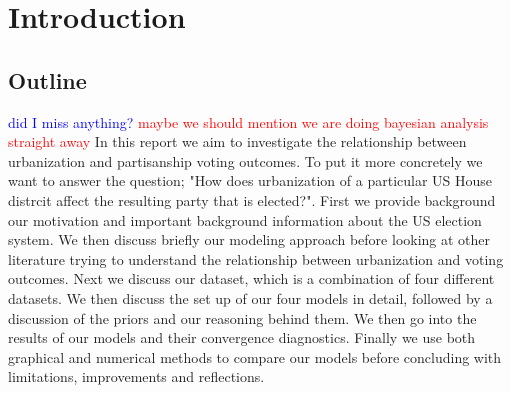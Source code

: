 \documentclass[12pt]{article}
\newcommand{\red}[1]{\textcolor{red}{#1}}
\newcommand{\blue}[1]{\textcolor{blue}{#1}}
\begin{document}











\thispagestyle{empty} %
\newpage

\tableofcontents
\newpage


\section{Introduction}
 
\subsection*{Outline}
\blue{did I miss anything?}
\red{maybe we should mention we are doing bayesian analysis straight away}
In this report we aim to investigate the relationship between urbanization and partisanship voting outcomes. To put it more concretely we want to answer the question; "How does urbanization of a particular US House distrcit affect the resulting party that is elected?". First we provide background our motivation and important background information about the US election system. 
We then discuss briefly our modeling approach before looking at other literature trying to understand the relationship between urbanization and voting outcomes. 
Next we discuss our dataset, which is a combination of four different datasets. 
We then discuss the set up of our four models in detail, followed by a discussion of the priors and our reasoning behind them. We then go into the results of our models and their convergence diagnostics. Finally we use both graphical and numerical methods to compare our models before concluding with limitations, improvements and reflections. 
\end{document}
